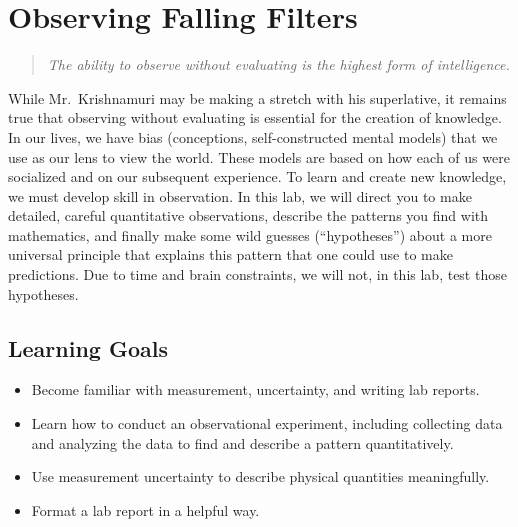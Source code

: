 \chapter{Observing Falling Filters}


	\begin{quotation}
		\textit{The ability to observe without evaluating is the highest form of intelligence.} 
	\end{quotation}

While Mr.\ Krishnamuri may be making a stretch with his superlative, it remains true that observing without evaluating is essential for the creation of knowledge.
In our lives, we have bias (conceptions, self-constructed mental models) that we use as our lens to view the world.
These models are based on how each of us were socialized and on our subsequent experience.
To learn and create new knowledge, we must develop skill in observation.
In this lab, we will direct you to make detailed, careful quantitative observations, describe the patterns you find with mathematics, and finally make some wild guesses (``hypotheses'') about a more universal principle that explains this pattern that one could use to make predictions.
Due to time and brain constraints, we will not, in this lab, test those hypotheses.

\section{Learning Goals}

 \begin{itemize}

  \item Become familiar with measurement, uncertainty, and writing lab reports.

  \item Learn how to conduct an observational experiment, including collecting data and analyzing the data to find and describe a pattern quantitatively.

  \item Use measurement uncertainty to describe physical quantities meaningfully.
  
  \item Format a lab report in a helpful way.
 \end{itemize}

